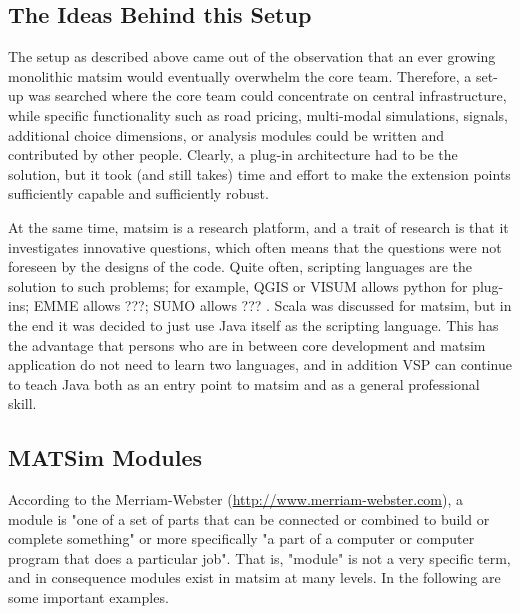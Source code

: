 \subsection{The Ideas Behind this Setup}
The setup as described above came out of the observation that an ever growing monolithic \gls{matsim} would eventually overwhelm the core team. Therefore, a set-up was searched where the core team could concentrate on central infrastructure, while specific functionality such as road pricing, multi-modal simulations, signals, additional choice dimensions, or analysis modules could be written and contributed by other people. Clearly, a plug-in architecture had to be the solution, but it took (and still takes) time and effort to make the extension points sufficiently capable and sufficiently robust.  

At the same time, \gls{matsim} is a research platform, and a trait of research is that it investigates innovative questions, which often means that the questions were not foreseen by the designs of the code.  Quite often, scripting languages are the solution to such problems; for example, QGIS or VISUM allows python \cite{...} for plug-ins; EMME allows ???; SUMO allows ??? .  Scala \cite{...} was discussed for \gls{matsim}, but in the end it was decided to just use Java itself as the scripting language.  This has the advantage that persons who are in between core development and \gls{matsim} application do not need to learn two languages, and in addition VSP can continue to teach Java both as an entry point to \gls{matsim} and as a general professional skill.

\subsection{MATSim Modules}
According to the Merriam-Webster (\url{http://www.merriam-webster.com}), a module is
%
"one of a set of parts that can be connected or combined to build or complete something" 
%
or more specifically
%
"a part of a computer or computer program that does a particular job". 
%
That is, "module" is not a very specific term, and in consequence modules exist in \gls{matsim} at many levels.
%
In the following are some important examples.



